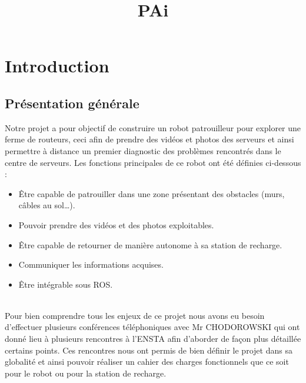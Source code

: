 \documentclass[french]{rapportENSTAB}
\title{PAi} %
\begin{document}





        
\fairemarges %
\fairepagedegarde %
\tableofcontents
\newpage

\section{Introduction} 
\subsection{Présentation générale} 
Notre projet a pour objectif de construire un robot patrouilleur pour explorer une ferme de routeurs, ceci afin de prendre des vidéos et photos des serveurs et ainsi permettre à distance un premier diagnostic des problèmes rencontrés dans le centre de serveurs. Les fonctions principales de ce robot ont été définies ci-dessous :\begin{itemize}[label=\textbullet, font=\small\color{blue}]
    \item Être capable de patrouiller dans une zone présentant des obstacles (murs, câbles au sol…).
    \item Pouvoir prendre des vidéos et des photos exploitables.
    \item Être capable de retourner de manière autonome à sa station de recharge.
    \item Communiquer les informations acquises.
    \item Être intégrable sous ROS.
\end{itemize}\\


Pour bien comprendre tous les enjeux de ce projet nous avons eu besoin d’effectuer plusieurs conférences téléphoniques avec Mr CHODOROWSKI qui ont donné lieu à plusieurs rencontres à l’ENSTA afin d’aborder de façon plus détaillée certains points. Ces rencontres nous ont permis de bien définir le projet dans sa globalité et ainsi pouvoir réaliser un cahier des charges fonctionnels que ce soit pour le robot ou pour la station de recharge.\\
\end{document}
